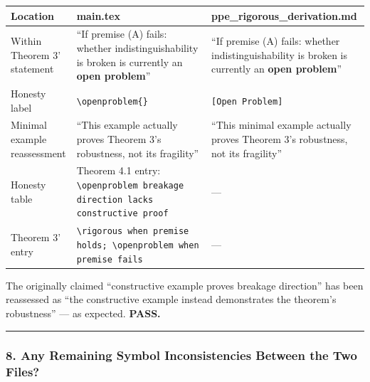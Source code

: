 \documentclass[
  12pt,
]{article}
\begin{document}
\begin{longtable}[]{@{}
  >{\raggedright\arraybackslash}p{}
  >{\raggedright\arraybackslash}p{}
  >{\raggedright\arraybackslash}p{}@{}}
\toprule\noalign{}
\begin{minipage}[b]{\linewidth}\raggedright
Location
\end{minipage} & \begin{minipage}[b]{\linewidth}\raggedright
main.tex
\end{minipage} & \begin{minipage}[b]{\linewidth}\raggedright
ppe\_rigorous\_derivation.md
\end{minipage} \\
\midrule\noalign{}
\endhead
\bottomrule\noalign{}
\endlastfoot
Within Theorem 3' statement & ``If premise (A) fails: whether indistinguishability is broken is currently an \textbf{open problem}'' & ``If premise (A) fails: whether indistinguishability is broken is currently an \textbf{open problem}'' \\
Honesty label & \texttt{{\textbackslash}openproblem\{\}} & \texttt{[Open Problem]} \\
Minimal example reassessment & ``This example actually proves Theorem 3's robustness, not its fragility'' & ``This minimal example actually proves Theorem 3's robustness, not its fragility'' \\
Honesty table & Theorem 4.1 entry: \texttt{{\textbackslash}openproblem\ breakage direction lacks constructive proof} & --- \\
Theorem 3' entry & \texttt{{\textbackslash}rigorous\ when premise holds;\ {\textbackslash}openproblem\ when premise fails} & --- \\
\end{longtable}

The originally claimed ``constructive example proves breakage direction'' has been reassessed as ``the constructive example instead demonstrates the theorem's robustness'' --- as expected. \textbf{PASS.}

\begin{center}\rule{0.5\linewidth}{0.5pt}\end{center}

\subsubsection{8. Any Remaining Symbol Inconsistencies Between the Two Files?}\label{remaining-symbol-inconsistencies}
\end{document}

